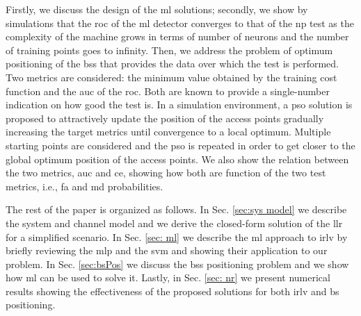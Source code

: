 \documentclass[twocolumns]{IEEEtran}
\begin{document}
Firstly, we discuss the design of the \ac{ml} solutions; secondly, we show by simulations that the \ac{roc} of the \ac{ml} detector converges to that of the \ac{np} test as the complexity of the machine grows in terms of number of neurons and the number of training points goes to infinity. Then, we address the problem of optimum positioning of the \acp{bs} that provides the data over which the test is performed. Two metrics are considered: the minimum value obtained by the training cost function and the \ac{auc} of the \ac{roc}. Both are known to provide a single-number indication on how good the test is. In a simulation environment, a \ac{pso} solution is proposed to attractively update the position of the access points gradually increasing the target metrics until convergence to a local optimum. Multiple starting points are considered and the \ac{pso} is repeated in order to get closer to the global optimum position of the access points. We also show the relation between the two metrics, \ac{auc} and \ac{ce}, showing how both are function of the two test metrics, i.e., \ac{fa} and \ac{md} probabilities.

The rest of the paper is organized as follows. In Sec. \ref{sec:sys model} we describe the system and channel model and we derive the closed-form solution of the \ac{llr} for a simplified scenario. In Sec. \ref{sec: ml} we describe the \ac{ml} approach to \ac{irlv} by briefly reviewing the \ac{mlp} and the \ac{svm} and showing their application to our problem. In Sec. \ref{sec:bsPos} we discuss the \acp{bs} positioning problem and we show how \ac{ml} can be used to solve it. Lastly, in Sec. \ref{sec: nr} we present numerical results showing the effectiveness of the proposed solutions for both \ac{irlv} and \ac{bs} positioning.

 
\end{document}
